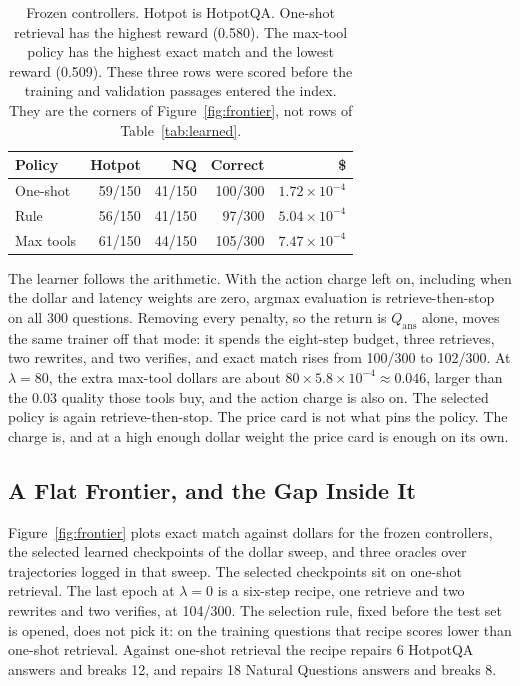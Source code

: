 \documentclass[letterpaper]{article} %
\begin{document}
\begin{table}[t]
\centering
\setlength{\tabcolsep}{3pt}
\small
\begin{tabular}{lrrrr}
\toprule
Policy & Hotpot & NQ & Correct & \$ \\
\midrule
One-shot & 59/150 & 41/150 & 100/300 & \(1.72\times 10^{-4}\) \\
Rule & 56/150 & 41/150 & 97/300 & \(5.04\times 10^{-4}\) \\
Max tools & 61/150 & 44/150 & 105/300 & \(7.47\times 10^{-4}\) \\
\bottomrule
\end{tabular}
\caption{Frozen controllers. Hotpot is HotpotQA. One-shot retrieval has the highest reward (0.580). The max-tool policy has the highest exact match and the lowest reward (0.509). These three rows were scored before the training and validation passages entered the index. They are the corners of Figure~\ref{fig:frontier}, not rows of Table~\ref{tab:learned}.}
\label{tab:frozen}
\end{table}

The learner follows the arithmetic. With the action charge left on, including when the dollar and latency weights are zero, argmax evaluation is retrieve-then-stop on all 300 questions. Removing every penalty, so the return is \(Q_{\mathrm{ans}}\) alone, moves the same trainer off that mode: it spends the eight-step budget, three retrieves, two rewrites, and two verifies, and exact match rises from 100/300 to 102/300. At \(\lambda{=}80\), the extra max-tool dollars are about \(80 \times 5.8\times 10^{-4} \approx 0.046\), larger than the 0.03 quality those tools buy, and the action charge is also on. The selected policy is again retrieve-then-stop. The price card is not what pins the policy. The charge is, and at a high enough dollar weight the price card is enough on its own.

\subsection{A Flat Frontier, and the Gap Inside It}
Figure~\ref{fig:frontier} plots exact match against dollars for the frozen controllers, the selected learned checkpoints of the dollar sweep, and three oracles over trajectories logged in that sweep. The selected checkpoints sit on one-shot retrieval. The last epoch at \(\lambda{=}0\) is a six-step recipe, one retrieve and two rewrites and two verifies, at 104/300. The selection rule, fixed before the test set is opened, does not pick it: on the training questions that recipe scores lower than one-shot retrieval. Against one-shot retrieval the recipe repairs 6 HotpotQA answers and breaks 12, and repairs 18 Natural Questions answers and breaks 8.
\end{document}
